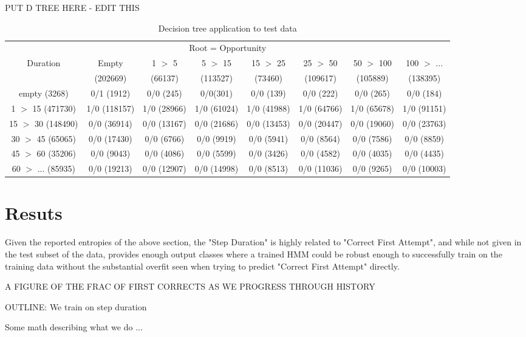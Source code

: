 \documentclass{article} %
\begin{document}
PUT D TREE HERE - EDIT THIS
\begin{table}[t]
\caption{Decision tree application to test data}
\begin{center}
\begin{tabular}{c|c|c|c|c|c|c|c}
\multicolumn{8}{c}{Root = Opportunity}\\
Duration & Empty & 1 $>$ 5 & 5 $>$ 15 & 15 $>$ 25 & 25 $>$ 50 & 50 $>$ 100 & 100 $>$ ...\\
& (202669) & (66137) & (113527) & (73460) & (109617) & (105889) & (138395)\\
\hline
empty (3268) & 0/1 (1912) & 0/0 (245) & 0/0(301) & 0/0 (139) & 0/0 (222) & 0/0 (265) & 0/0 (184)\\
1 $>$ 15 (471730) & 1/0 (118157) & 1/0  (28966) & 1/0 (61024) & 1/0 (41988) & 1/0 (64766) & 1/0 (65678) & 1/0 (91151)\\
15 $>$ 30 (148490) & 0/0 (36914) & 0/0  (13167) & 0/0 (21686) & 0/0 (13453) & 0/0 (20447) & 0/0 (19060) & 0/0 (23763)\\
30 $>$ 45 (65065) & 0/0 (17430) & 0/0  (6766) & 0/0 (9919) & 0/0 (5941) & 0/0 (8564) & 0/0 (7586) & 0/0 (8859)\\
45 $>$ 60 (35206) & 0/0 (9043) & 0/0 (4086) & 0/0 (5599) & 0/0 (3426) & 0/0 (4582) & 0/0 (4035) & 0/0 (4435)\\
60 $>$ ... (85935) & 0/0 (19213) & 0/0 (12907) & 0/0 (14998) & 0/0 (8513) & 0/0 (11036) & 0/0 (9265) & 0/0 (10003)\\
\end{tabular}
\end{center}
\end{table}

\section{Resuts}

Given the reported entropies of the above section, the "Step Duration" is highly related to "Correct First Attempt", and while not given in the test subset of the data, provides enough output classes where a trained HMM could be robust enough to successfully train on the training data without the substantial overfit seen when trying to predict "Correct First Attempt" directly.

A FIGURE OF THE FRAC OF FIRST CORRECTS AS WE PROGRESS THROUGH HISTORY


OUTLINE:
We train on step duration

Some math describing what we do
...
\end{document}
